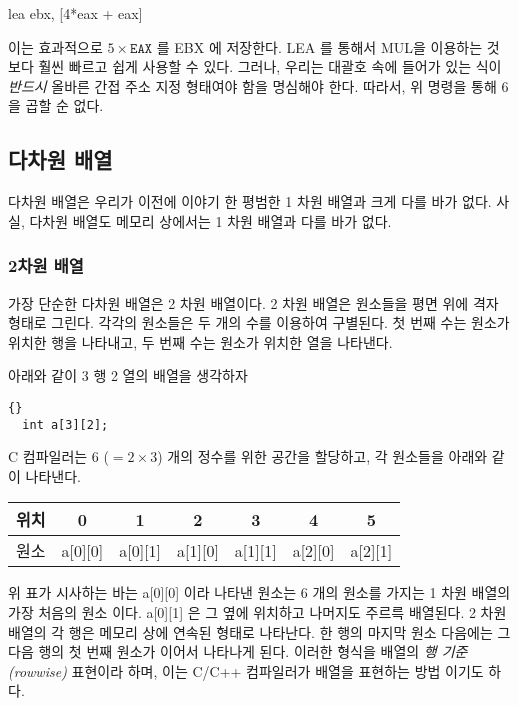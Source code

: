 \begin{AsmCodeListing}[numbers=none,frame=none]
      lea    ebx, [4*eax + eax]
\end{AsmCodeListing}
이는 효과적으로 $5 \times \mathtt{EAX}$ 를 EBX 에 저장한다. {\code LEA} 를 통해서
{\code MUL}을 이용하는 것 보다 훨씬 빠르고 쉽게 사용할 수 있다. 그러나, 
우리는 대괄호 속에 들어가 있는 식이 \emph{반드시} 올바른 간접 주소 지정 형태여야 함을 명심해야 
한다. 따라서, 위 명령을 통해 6 을 곱할 순 없다.


\subsection{다차원 배열}

다차원 배열은 우리가 이전에 이야기 한 평범한 1 차원 배열과 크게 다를 바가 없다. 
사실, 다차원 배열도 메모리 상에서는 1 차원 배열과 다를 바가 없다. 

\subsubsection{2차원 배열}
가장 단순한 다차원 배열은 2 차원 배열이다. 2 차원 배열은 원소들을 평면 위에 격자
형태로 그린다. 각각의 원소들은 두 개의 수를 이용하여 구별된다. 첫 번째 수는 원소가
위치한 행을 나타내고, 두 번째 수는 원소가 위치한 열을 나타낸다. 

아래와 같이 3 행 2 열의 배열을 생각하자

\begin{lstlisting}[stepnumber=0]{}
  int a[3][2];
\end{lstlisting}

C 컴파일러는 6 ($= 2 \times 3$) 개의 정수를 위한 공간을 할당하고, 각 원소들을
아래와 같이 나타낸다. 

\parbox{\textwidth}{
\vspace{0.5em}
\centering
\begin{tabular}{||l|c|c|c|c|c|c||}
\hline
위치 & 0 & 1 & 2 & 3 & 4 & 5 \\
\hline
원소 & a[0][0] & a[0][1] & a[1][0] & a[1][1] & a[2][0] & a[2][1]  \\
\hline
\end{tabular}
\vspace{0.5em}
}
\noindent 위 표가 시사하는 바는 {\code a[0][0]} 이라 나타낸 원소는 
6 개의 원소를 가지는 1 차원 배열의 가장 처음의 원소 이다. {\code a[0][1]}
은 그 옆에 위치하고 나머지도 주르륵 배열된다. 2 차원 배열의 각 행은
메모리 상에 연속된 형태로 나타난다. 한 행의 마지막 원소 다음에는 그 다음
행의 첫 번째 원소가 이어서 나타나게 된다. 이러한 형식을 배열의 \emph{행 기준(rowwise)} 표현이라
하며, 이는 C/C++ 컴파일러가 배열을 표현하는 방법 이기도 하다. 

